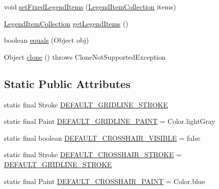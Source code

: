 \begin{DoxyCompactItemize}
\item 
void \mbox{\hyperlink{classorg_1_1jfree_1_1chart_1_1plot_1_1_x_y_plot_a2cf1eedb574018155003b6a411fe691c}{set\+Fixed\+Legend\+Items}} (\mbox{\hyperlink{classorg_1_1jfree_1_1chart_1_1_legend_item_collection}{Legend\+Item\+Collection}} items)
\item 
\mbox{\hyperlink{classorg_1_1jfree_1_1chart_1_1_legend_item_collection}{Legend\+Item\+Collection}} \mbox{\hyperlink{classorg_1_1jfree_1_1chart_1_1plot_1_1_x_y_plot_a6c69d52c6e874aa6c6a854951c8e0aa2}{get\+Legend\+Items}} ()
\item 
boolean \mbox{\hyperlink{classorg_1_1jfree_1_1chart_1_1plot_1_1_x_y_plot_a1e3d4ae560ec96a7a33ac2c1044bda3d}{equals}} (Object obj)
\item 
Object \mbox{\hyperlink{classorg_1_1jfree_1_1chart_1_1plot_1_1_x_y_plot_a0a7a341c89e75eeb6fc3eb1042e67cb3}{clone}} ()  throws Clone\+Not\+Supported\+Exception 
\end{DoxyCompactItemize}
\subsection*{Static Public Attributes}
\begin{DoxyCompactItemize}
\item 
static final Stroke \mbox{\hyperlink{classorg_1_1jfree_1_1chart_1_1plot_1_1_x_y_plot_adc7bbbd3dff1d9cecbff52a673b3a46d}{D\+E\+F\+A\+U\+L\+T\+\_\+\+G\+R\+I\+D\+L\+I\+N\+E\+\_\+\+S\+T\+R\+O\+KE}}
\item 
static final Paint \mbox{\hyperlink{classorg_1_1jfree_1_1chart_1_1plot_1_1_x_y_plot_af462b9eb878082c6de72f68a98756dc5}{D\+E\+F\+A\+U\+L\+T\+\_\+\+G\+R\+I\+D\+L\+I\+N\+E\+\_\+\+P\+A\+I\+NT}} = Color.\+light\+Gray
\item 
static final boolean \mbox{\hyperlink{classorg_1_1jfree_1_1chart_1_1plot_1_1_x_y_plot_a9792f85d624b3e1cbc5102e1f2ae0462}{D\+E\+F\+A\+U\+L\+T\+\_\+\+C\+R\+O\+S\+S\+H\+A\+I\+R\+\_\+\+V\+I\+S\+I\+B\+LE}} = false
\item 
static final Stroke \mbox{\hyperlink{classorg_1_1jfree_1_1chart_1_1plot_1_1_x_y_plot_a615c94709a1ba4a1c6decbd0d21ef4b3}{D\+E\+F\+A\+U\+L\+T\+\_\+\+C\+R\+O\+S\+S\+H\+A\+I\+R\+\_\+\+S\+T\+R\+O\+KE}} = \mbox{\hyperlink{classorg_1_1jfree_1_1chart_1_1plot_1_1_x_y_plot_adc7bbbd3dff1d9cecbff52a673b3a46d}{D\+E\+F\+A\+U\+L\+T\+\_\+\+G\+R\+I\+D\+L\+I\+N\+E\+\_\+\+S\+T\+R\+O\+KE}}
\item 
static final Paint \mbox{\hyperlink{classorg_1_1jfree_1_1chart_1_1plot_1_1_x_y_plot_ac4b8ae751fa577285ef127236fdedbbf}{D\+E\+F\+A\+U\+L\+T\+\_\+\+C\+R\+O\+S\+S\+H\+A\+I\+R\+\_\+\+P\+A\+I\+NT}} = Color.\+blue
\end{DoxyCompactItemize}

